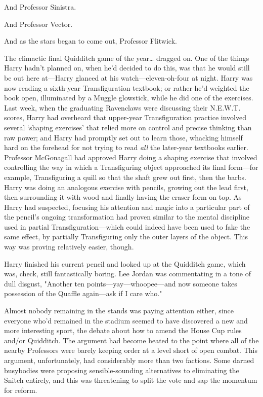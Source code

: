 And Professor Sinistra.

And Professor Vector.

And as the stars began to come out, Professor Flitwick.

The climactic final Quidditch game of the year{\ldots} dragged on.
\sbreak
One of the things Harry hadn't planned on, when he'd decided to do this, was 
that he would still be out here at---Harry glanced at his 
watch---eleven-oh-four at night. Harry was now reading a sixth-year 
Transfiguration textbook; or rather he'd weighted the book open, illuminated by 
a Muggle glowstick, while he did one of the exercises. Last week, when the 
graduating Ravenclaws were discussing their N.E.W.T. scores, Harry had 
overheard that upper-year Transfiguration practice involved several `shaping 
exercises' that relied more on control and precise thinking than raw power; and 
Harry had promptly set out to learn those, whacking himself hard on the 
forehead for not trying to read \emph{all} the later-year textbooks earlier. 
Professor McGonagall had approved Harry doing a shaping exercise that involved 
controlling the way in which a Transfiguring object approached its final 
form---for example, Transfiguring a quill so that the shaft grew out first, 
then the barbs. Harry was doing an analogous exercise with pencils, growing out 
the lead first, then surrounding it with wood and finally having the eraser 
form on top. As Harry had suspected, focusing his attention and magic into a 
particular part of the pencil's ongoing transformation had proven similar to 
the mental discipline used in partial Transfiguration---which could indeed have 
been used to fake the same effect, by partially Transfiguring only the outer 
layers of the object. This way was proving relatively easier, though.

Harry finished his current pencil and looked up at the Quidditch game, which 
was, check, still fantastically boring. Lee Jordan was commentating in a tone 
of dull disgust, "Another ten points---yay---whoopee---and now someone takes 
possession of the Quaffle again---ask if I care who."

Almost nobody remaining in the stands was paying attention either, since 
everyone who'd remained in the stadium seemed to have discovered a new and more 
interesting sport, the debate about how to amend the House Cup rules and/or 
Quidditch. The argument had become heated to the point where all of the nearby 
Professors were barely keeping order at a level short of open combat. This 
argument, unfortunately, had considerably more than two factions. Some darned 
busybodies were proposing sensible-sounding alternatives to eliminating the 
Snitch entirely, and this was threatening to split the vote and sap the 
momentum for reform.

